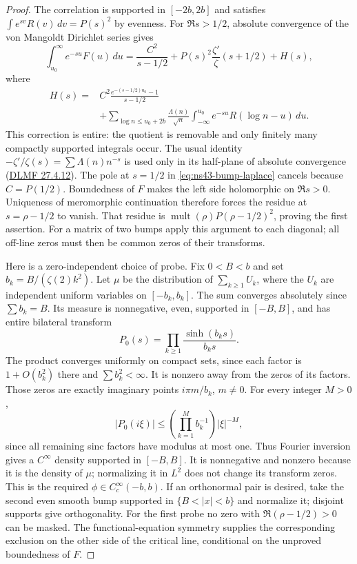 \documentclass[11pt]{article}
\theoremstyle{remark}
\begin{document}
\begin{proof}
The correlation is supported in $[-2b,2b]$ and satisfies
$\int e^{sv}R(v)\,dv=P(s)^2$ by evenness. For $\Re s>1/2$,
absolute convergence of the von Mangoldt Dirichlet series gives
\begin{equation}\label{eq:ns43-bump-laplace}
 \int_{u_0}^{\infty}e^{-su}F(u)\,du
 =\frac{C^2}{s-1/2}+P(s)^2\frac{\zeta'}{\zeta}(s+1/2)+H(s),
\end{equation}
where
\begin{align*}
 H(s)={}&C^2\frac{e^{-(s-1/2)u_0}-1}{s-1/2}\\
 &+\sum_{\log n\le u_0+2b}\frac{\Lambda(n)}{\sqrt n}
       \int_{-\infty}^{u_0}e^{-su}R(\log n-u)\,du.
\end{align*}
This correction is entire: the quotient is removable and only
finitely many compactly supported integrals occur. The usual
identity $-\zeta'/\zeta(s)=\sum\Lambda(n)n^{-s}$ is used only in
its half-plane of absolute convergence (\href{https://dlmf.nist.gov/27.4.E12}{DLMF 27.4.12}). The pole at $s=1/2$ in
\eqref{eq:ns43-bump-laplace} cancels because $C=P(1/2)$.
Boundedness of $F$ makes the left side holomorphic on $\Re s>0$.
Uniqueness of meromorphic continuation therefore forces the residue
at $s=\rho-1/2$ to vanish. That residue is
$\operatorname{mult}(\rho)P(\rho-1/2)^2$, proving the first assertion.
For a matrix of two bumps apply this argument to each diagonal;
all off-line zeros must then be common zeros of their transforms.

Here is a zero-independent choice of probe. Fix $0<B<b$ and set
$b_k=B/(\zeta(2)k^2)$. Let $\mu$ be the distribution of
$\sum_{k\ge1}U_k$, where the $U_k$ are independent uniform variables
on $[-b_k,b_k]$. The sum converges absolutely since $\sum b_k=B$.
Its measure is nonnegative, even, supported in $[-B,B]$, and has
entire bilateral transform
\[
 P_0(s)=\prod_{k\ge1}\frac{\sinh(b_ks)}{b_ks}.
\]
The product converges uniformly on compact sets, since each factor
is $1+O(b_k^2)$ there and $\sum b_k^2<\infty$. It is nonzero away
from the zeros of its factors. Those zeros are exactly imaginary
points $i\pi m/b_k$, $m\ne0$.
For every integer $M>0$,
\[
 |P_0(i\xi)|\le
 \left(\prod_{k=1}^M b_k^{-1}\right)|\xi|^{-M},
\]
since all remaining sinc factors have modulus at most one. Thus
Fourier inversion gives a $C^\infty$ density supported in $[-B,B]$.
It is nonnegative and nonzero because it is the density of $\mu$;
normalizing it in $L^2$ does not change its transform zeros. This is
the required $\phi\in C_c^\infty(-b,b)$. If an orthonormal pair is
desired, take the second even smooth bump supported in
$\{B<|x|<b\}$ and normalize it; disjoint supports give orthogonality.
For the first probe no zero with $\Re(\rho-1/2)>0$ can be masked.
The functional-equation symmetry supplies the corresponding exclusion
on the other side of the critical line, conditional on the unproved
boundedness of $F$.
\end{proof}
\end{document}

